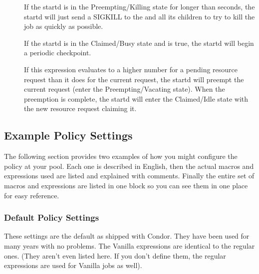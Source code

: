\begin{description}
\item[] If the startd is in the
  Preempting/Killing state for longer than 
  seconds, the startd will just send a SIGKILL to the 
  and all its children to try to kill the job as quickly as possible.
  
\item[] If the startd is in the
  Claimed/Busy state and  is true, the
  startd will begin a periodic checkpoint.
  
\item[] If this expression evaluates to a higher number for
  a pending resource request than it does for the current request, the
  startd will preempt the current request (enter the
  Preempting/Vacating state).  When the preemption is complete, the
  startd will enter the Claimed/Idle state with the new resource
  request claiming it.

\end{description}

\subsection{Example Policy Settings}
\label{sec:Example-Policy}

The following section provides two examples of how you might configure
the policy at your pool.  Each one is described in English, then the
actual macros and expressions used are listed and explained with
comments.  Finally the entire set of macros and expressions are listed
in one block so you can see them in one place for easy reference.

\subsubsection{Default Policy Settings}
\label{sec:Default-Policy}

These settings are the default as shipped with Condor.  They have been
used for many years with no problems.  The Vanilla expressions are
identical to the regular ones. (They aren't even listed here.  If you
don't define them, the regular expressions are used for Vanilla jobs
as well).

